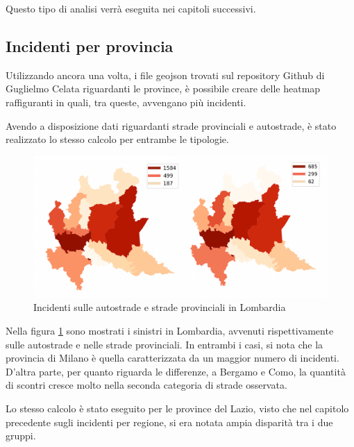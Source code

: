\documentclass[a4paper,12pt]{report}
\begin{document}
Questo tipo di analisi verrà eseguita nei capitoli successivi. 

\subsection{Incidenti per provincia}

Utilizzando ancora una volta, i file geojson trovati sul repository Github di 
Guglielmo Celata riguardanti le province, 
è possibile creare delle heatmap raffiguranti in quali, tra queste, avvengano più 
incidenti. 

Avendo a disposizione dati riguardanti strade provinciali e autostrade, 
è stato realizzato lo stesso calcolo per entrambe le tipologie. 

\begin{figure}
    \includegraphics[width=\linewidth]{img_unite/lombardia_autostrade_provinciali.png}
    \caption{Incidenti sulle autostrade e strade provinciali in Lombardia}
    \label{fig:lombardia-strade}
\end{figure}

Nella figura \ref{fig:lombardia-strade} sono mostrati i sinistri in Lombardia, 
avvenuti rispettivamente sulle autostrade e nelle strade provinciali. 
In entrambi i casi, si nota che la provincia di Milano è quella caratterizzata da 
un maggior numero di incidenti. 
D'altra parte, per quanto riguarda le differenze, a Bergamo e Como, 
la quantità di scontri cresce molto nella seconda categoria di strade osservata. 

Lo stesso calcolo è stato eseguito per le province del Lazio, visto che nel capitolo 
precedente sugli incidenti per regione, si era notata ampia disparità tra i due gruppi. 
\end{document}
